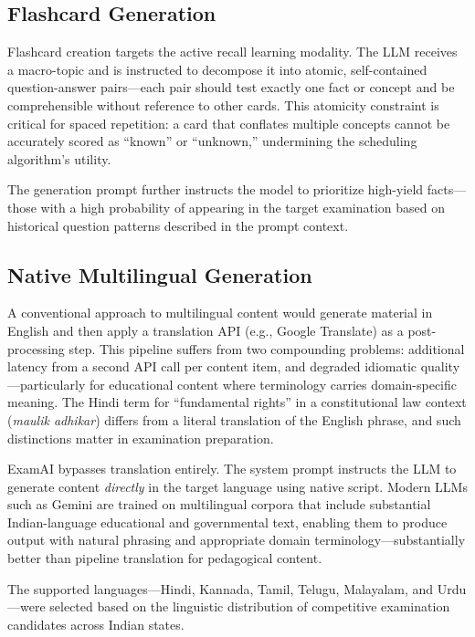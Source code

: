 \documentclass[conference]{IEEEtran}
\begin{document}
\subsection{Flashcard Generation}

Flashcard creation targets the active recall learning modality. The LLM receives a macro-topic and is instructed to decompose it into atomic, self-contained question-answer pairs---each pair should test exactly one fact or concept and be comprehensible without reference to other cards. This atomicity constraint is critical for spaced repetition: a card that conflates multiple concepts cannot be accurately scored as ``known'' or ``unknown,'' undermining the scheduling algorithm's utility.

The generation prompt further instructs the model to prioritize high-yield facts---those with a high probability of appearing in the target examination based on historical question patterns described in the prompt context.

\subsection{Native Multilingual Generation}

A conventional approach to multilingual content would generate material in English and then apply a translation API (e.g., Google Translate) as a post-processing step. This pipeline suffers from two compounding problems: additional latency from a second API call per content item, and degraded idiomatic quality---particularly for educational content where terminology carries domain-specific meaning. The Hindi term for ``fundamental rights'' in a constitutional law context (\textit{maulik adhikar}) differs from a literal translation of the English phrase, and such distinctions matter in examination preparation.

ExamAI bypasses translation entirely. The system prompt instructs the LLM to generate content \textit{directly} in the target language using native script. Modern LLMs such as Gemini are trained on multilingual corpora that include substantial Indian-language educational and governmental text, enabling them to produce output with natural phrasing and appropriate domain terminology---substantially better than pipeline translation for pedagogical content.

The supported languages---Hindi, Kannada, Tamil, Telugu, Malayalam, and Urdu---were selected based on the linguistic distribution of competitive examination candidates across Indian states.
\end{document}
